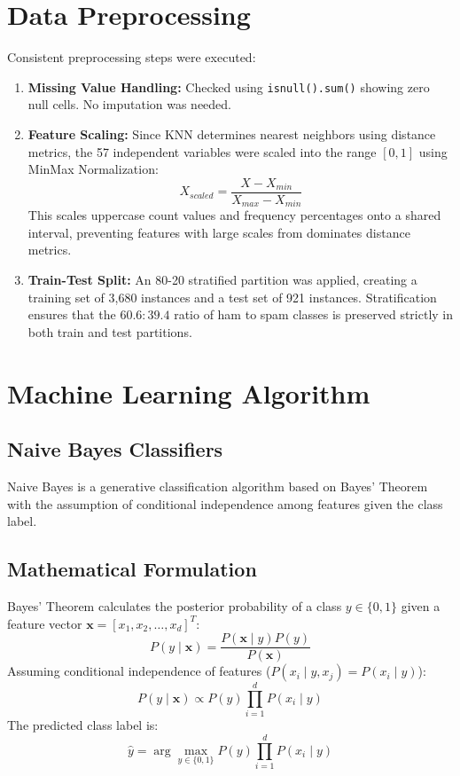 \documentclass[12pt,a4paper]{article}
\begin{document}
\section{Data Preprocessing}
Consistent preprocessing steps were executed:
\begin{enumerate}
    \item \textbf{Missing Value Handling:} Checked using \texttt{isnull().sum()} showing zero null cells. No imputation was needed.
    \item \textbf{Feature Scaling:} Since KNN determines nearest neighbors using distance metrics, the 57 independent variables were scaled into the range $[0, 1]$ using MinMax Normalization:
    \begin{equation}
        X_{scaled} = \frac{X - X_{min}}{X_{max} - X_{min}}
    \end{equation}
    This scales uppercase count values and frequency percentages onto a shared interval, preventing features with large scales from dominates distance metrics.
    \item \textbf{Train-Test Split:} An 80-20 stratified partition was applied, creating a training set of 3,680 instances and a test set of 921 instances. Stratification ensures that the $60.6:39.4$ ratio of ham to spam classes is preserved strictly in both train and test partitions.
\end{enumerate}

\section{Machine Learning Algorithm}

\subsection{Naive Bayes Classifiers}
Naive Bayes is a generative classification algorithm based on Bayes' Theorem with the assumption of conditional independence among features given the class label.

\subsection*{Mathematical Formulation}
Bayes' Theorem calculates the posterior probability of a class $y \in \{0, 1\}$ given a feature vector $\mathbf{x} = [x_1, x_2, \dots, x_d]^T$:
\begin{equation}
    P(y \mid \mathbf{x}) = \frac{P(\mathbf{x} \mid y) P(y)}{P(\mathbf{x})}
\end{equation}
Assuming conditional independence of features ($P(x_i \mid y, x_j) = P(x_i \mid y)$):
\begin{equation}
    P(y \mid \mathbf{x}) \propto P(y) \prod_{i=1}^{d} P(x_i \mid y)
\end{equation}
The predicted class label is:
\begin{equation}
    \hat{y} = \arg\max_{y \in \{0, 1\}} P(y) \prod_{i=1}^{d} P(x_i \mid y)
\end{equation}
\end{document}
